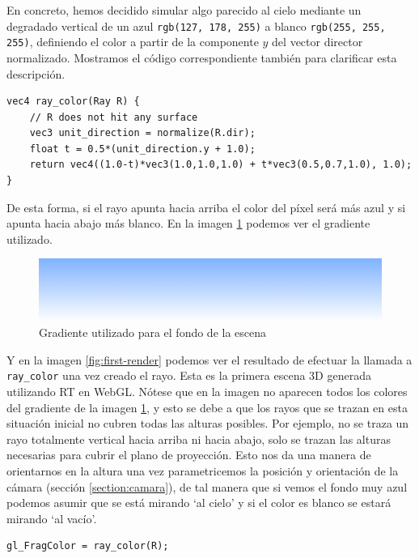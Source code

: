 En concreto, hemos decidido simular algo parecido al cielo mediante un degradado vertical de un \textcolor{background-blue}{azul} \texttt{rgb(127, 178, 255)} a blanco \texttt{rgb(255, 255, 255)}, definiendo el color a partir de la componente $y$ del vector director normalizado. Mostramos el código correspondiente también para clarificar esta descripción.

\begin{lstlisting}
vec4 ray_color(Ray R) {
    // R does not hit any surface
    vec3 unit_direction = normalize(R.dir);
    float t = 0.5*(unit_direction.y + 1.0);
    return vec4((1.0-t)*vec3(1.0,1.0,1.0) + t*vec3(0.5,0.7,1.0), 1.0);
}
\end{lstlisting}

De esta forma, si el rayo apunta hacia arriba el color del píxel será más azul y si apunta hacia abajo más blanco. En la imagen \ref{fig:background} podemos ver el gradiente utilizado.

\begin{figure} [ht]
    \centering
    \includegraphics[scale = 0.35]{img/C7/background-gradient.png}
    \caption{Gradiente utilizado para el fondo de la escena}
    \label{fig:background}
\end{figure}

Y en la imagen \ref{fig:first-render} podemos ver el resultado de efectuar la llamada a \verb|ray_color| una vez creado el rayo. Esta es la primera escena 3D generada utilizando RT en WebGL. Nótese que en la imagen no aparecen todos los colores del gradiente de la imagen \ref{fig:background}, y esto se debe a que los rayos que se trazan en esta situación inicial no cubren todas las alturas posibles. Por ejemplo, no se traza un rayo totalmente vertical hacia arriba ni hacia abajo, solo se trazan las alturas necesarias para cubrir el plano de proyección. Esto nos da una manera de orientarnos en la altura una vez parametricemos la posición y orientación de la cámara (sección \ref{section:camara}), de tal manera que si vemos el fondo muy azul podemos asumir que se está mirando `al cielo' y si el color es blanco se estará mirando `al vacío'. 

\begin{lstlisting}
gl_FragColor = ray_color(R);
\end{lstlisting}

